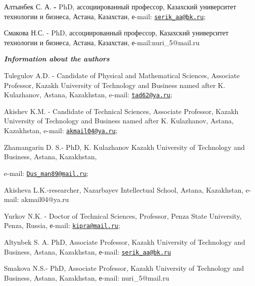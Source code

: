 Алтынбек С. А. {\bfseries -} PhD, ассоциированный профессор, Казахский
университет технологии и бизнеса, Астана, Казахстан, е-mail:
\href{mailto:serik_aa@bk.ru}{\nolinkurl{serik\_aa@bk.ru}};

Смакова Н.С. - PhD, ассоциированный профессор, Казахский университет
технологии и бизнеса, Астана, Казахстан, е-mail:nuri\_5@mail.ru

\emph{{\bfseries Information about the authors}}

Tulegulov A.D. - Candidate of Physical and Mathematical Sciences,
Associate Professor, Kazakh University of Technology and Business named
after K. Kulazhanov, Astana, Kazakhstan, e-mail:
\href{mailto:tad62@ya.ru}{\nolinkurl{tad62@ya.ru}};

Akishev K.M. - Candidate of Technical Sciences, Associate Professor,
Kazakh University of Technology and Business named after K. Kulazhanov,
Astana, Kazakhstan, e-mail:
\href{mailto:akmail04@ya.ru}{\nolinkurl{akmail04@ya.ru}};

Zhamangarin D. S.- PhD, K. Kulazhanov Kazakh University of Technology
and Business, Astana, Kazakhstan,

e-mail: \href{mailto:Dus_man89@mail.ru}{\nolinkurl{Dus\_man89@mail.ru}};

Akisheva L.K.-researcher, Nazarbayev Intellectual School, Astana,
Kazakhstan, e-mail: akmail04@ya.ru

Yurkov N.K. - Doctor of Technical Sciences, Professor, Penza State
University, Penza, Russia, е-mail:
\href{mailto:kipra@mail.ru}{\nolinkurl{kipra@mail.ru}};

Altynbek S. A. PhD, Associate Professor, Kazakh University of Technology
and Business, Astana, Kazakhstan, е-mail:
\href{mailto:serik_aa@bk.ru}{\nolinkurl{serik\_aa@bk.ru}}

Smakova N.S.- PhD, Associate Professor, Kazakh University of Technology
and Business, Astana, Kazakhstan, е-mail: nuri\_5@mail.ru
